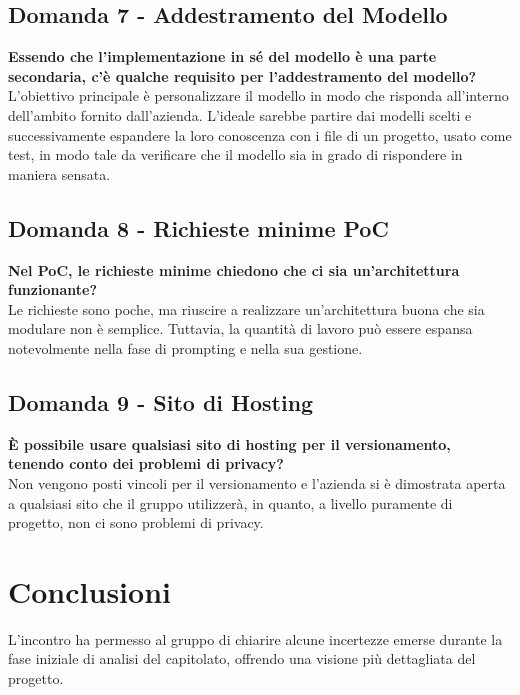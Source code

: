 \documentclass[10pt]{article}
\begin{document}
    \subsection{Domanda 7 - Addestramento del Modello}
    \textbf{Essendo che l'implementazione in sé del modello è una parte secondaria, c'è qualche requisito per l'addestramento del modello?} 
    \\
    \textnormal{L'obiettivo principale è personalizzare il modello in modo che risponda all'interno dell'ambito fornito dall'azienda. L'ideale sarebbe partire dai modelli scelti e successivamente espandere la loro conoscenza con i file di un progetto, usato come test, in modo tale da verificare che il modello sia in grado di rispondere in maniera sensata.} 

    \subsection{Domanda 8 - Richieste minime PoC}
    \textbf{Nel PoC, le richieste minime chiedono che ci sia un'architettura funzionante?} 
    \\
    \textnormal{Le richieste sono poche, ma riuscire a realizzare un'architettura buona che sia modulare non è semplice. Tuttavia, la quantità di lavoro può essere espansa notevolmente nella fase di prompting e nella sua gestione.} 
    
    \subsection{Domanda 9 - Sito di Hosting}
    \textbf{È possibile usare qualsiasi sito di hosting per il versionamento, tenendo conto dei problemi di privacy?} 
    \\
    \textnormal{Non vengono posti vincoli per il versionamento e l'azienda si è dimostrata aperta a qualsiasi sito che il gruppo utilizzerà, in quanto, a livello puramente di progetto, non ci sono problemi di privacy.} 
    
    
    \section{Conclusioni}
    L'incontro ha permesso al gruppo di chiarire alcune incertezze emerse durante la fase iniziale di analisi del capitolato, offrendo una visione più dettagliata del progetto.
    \newpage
    \newpage

     
\end{document}
